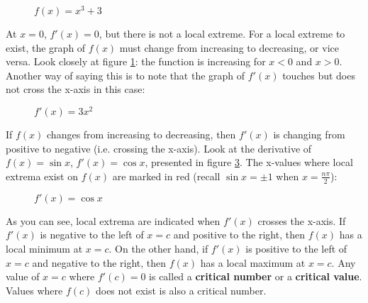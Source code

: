\begin{figure}
	\centering
	\caption{$f(x) = x^3+3$}
	\label{fig:nonextrema}
\end{figure}


At $x=0$, $f'(x)=0$, but there is not a local extreme. For a local extreme to exist, the graph of $f(x)$ must change from increasing to decreasing, or vice versa. Look closely at figure \ref{fig:nonextrema}: the function is increasing for $x<0$ and $x>0$. Another way of saying this is to note that the graph of $f'(x)$ touches but does not cross the x-axis in this case:

\begin{figure}
	\centering
	\caption{$f'(x) = 3x^2$}
	\label{fig:touch}
\end{figure}


If $f(x)$ changes from increasing to decreasing, then $f'(x)$ is changing from positive to negative (i.e. crossing the x-axis). Look at the derivative of $f(x)=\sin{x}$, $f'(x)=\cos{x}$, presented in figure \ref{fig:fprimecos}. The x-values where local extrema exist on $f(x)$ are marked in red (recall $\sin{x} = \pm 1$ when $x=\frac{n\pi}{2}$):

\begin{figure}
	\centering
	\caption{$f'(x) = \cos{x}$}
	\label{fig:fprimecos}
\end{figure}


As you can see, local extrema are indicated when $f'(x)$ crosses the x-axis. If $f'(x)$ is negative to the left of $x=c$ and positive to the right, then $f(x)$ has a local minimum at $x=c$. On the other hand, if $f'(x)$ is positive to the left of $x=c$ and negative to the right, then $f(x)$ has a local maximum at $x=c$. Any value of $x=c$ where $f'(c) = 0$ is called a \textbf{critical number} or a \textbf{critical value}. Values where $f(c)$ does not exist is also a critical number. 

